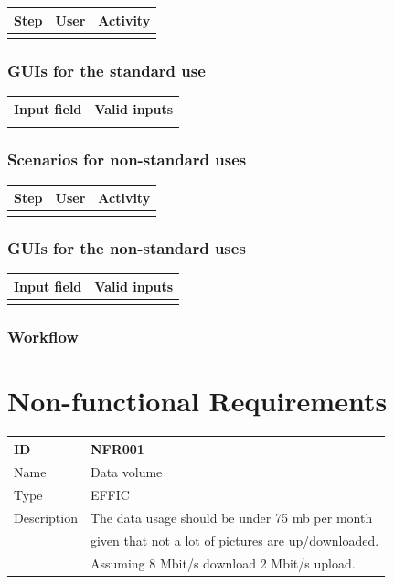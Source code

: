 \documentclass[12pt]{article}
\theoremstyle{definition}
\begin{document}
\begin{tabular}{|l|l|l|}
\hline
Step & User & Activity \\ \hline
 & & \\ \hline
\end{tabular}

\subsubsection{GUIs for the standard use}

\begin{tabular}{|l|l|}
\hline
Input field & Valid inputs \\ \hline
 &  \\ \hline
\end{tabular}

\subsubsection{Scenarios for non-standard uses}

\begin{tabular}{|l|l|l|}
\hline
Step & User & Activity \\ \hline
 & & \\ \hline
\end{tabular}

\subsubsection{GUIs for the non-standard uses}

\begin{tabular}{|l|l|}
\hline
Input field & Valid inputs \\ \hline
 &  \\ \hline
\end{tabular}

\subsubsection{Workflow}

\pagebreak

\section{Non-functional Requirements}

\begin{flushleft}
  \begin{tabular}{|l|L{10cm}|}
  \hline
  ID & NFR001\\ \hline
  Name & Data volume \\ \hline
  Type &  EFFIC\\ \hline
  Description & The data usage should be under 75 mb per month \\
  & given that not a lot of pictures are up/downloaded. \\
  & Assuming 8 Mbit/s download 2 Mbit/s upload. \\ \hline
  \end{tabular}
\end{flushleft}
\end{document}
